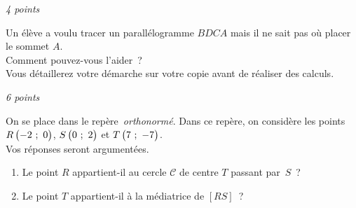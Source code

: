 \documentclass[a4paper,12pt,twocolumn,landscape]{article}
\begin{document}
\vspace*{1em}

\begin{minipage}{0.45\textwidth}
\thispagestyle{firststyle}

\vspace*{1em}

\exercice\hfill \emph{4 points}

Un élève a voulu tracer un parallélogramme $BDCA$ mais il ne sait pas où placer le sommet $A$.\\ Comment pouvez-vous l'aider~?\\ Vous détaillerez votre démarche sur votre copie avant de réaliser des calculs.

\begin{center}


\end{center}


\vspace*{2em}

\exercice\hfill \emph{6 points}

On se place dans le repère~\emph{orthonormé}. Dans ce repère, on considère les points $R\begin{pmatrix}-2~;~0\end{pmatrix}$, $S\begin{pmatrix}0~;~2\end{pmatrix}$ et $T\begin{pmatrix}7~;~-7\end{pmatrix}$.\\Vos réponses seront argumentées.

	\begin{enumerate}
		\item Le point $R$ appartient-il au cercle $\mathscr{C}$ de centre $T$ passant par~$S$~?
		\item Le point $T$ appartient-il à la médiatrice de $\left[RS\right]$~?
	\end{enumerate}



\vspace{-2em}


\end{minipage}
\newpage
\end{document}
